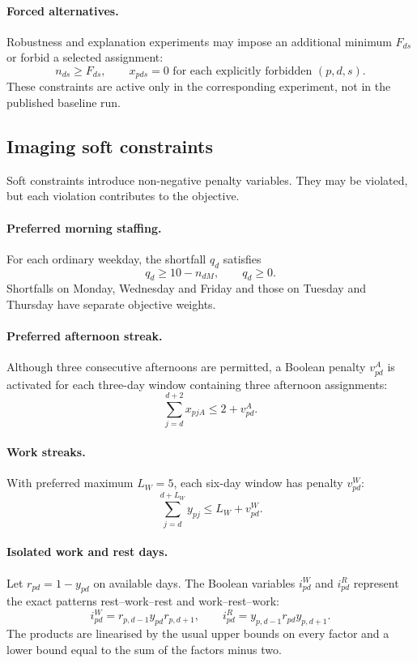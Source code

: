 \documentclass[11pt,a4paper]{article}
\begin{document}
\paragraph{Forced alternatives.}
Robustness and explanation experiments may impose an additional minimum $F_{ds}$ or forbid a selected assignment:
\[
 n_{ds}\geq F_{ds},
 \qquad x_{pds}=0\text{ for each explicitly forbidden }(p,d,s).
\]
These constraints are active only in the corresponding experiment, not in the published baseline run.

\subsection{Imaging soft constraints}

Soft constraints introduce non-negative penalty variables. They may be violated, but each violation contributes to the objective.

\paragraph{Preferred morning staffing.}
For each ordinary weekday, the shortfall $q_d$ satisfies
\[
 q_d\geq10-n_{dM},\qquad q_d\geq0.
\]
Shortfalls on Monday, Wednesday and Friday and those on Tuesday and Thursday have separate objective weights.

\paragraph{Preferred afternoon streak.}
Although three consecutive afternoons are permitted, a Boolean penalty $v^{A}_{pd}$ is activated for each three-day window containing three afternoon assignments:
\[
 \sum_{j=d}^{d+2}x_{pjA}\leq2+v^{A}_{pd}.
\]

\paragraph{Work streaks.}
With preferred maximum $L_W=5$, each six-day window has penalty $v^{W}_{pd}$:
\[
 \sum_{j=d}^{d+L_W}y_{pj}\leq L_W+v^{W}_{pd}.
\]

\paragraph{Isolated work and rest days.}
Let $r_{pd}=1-y_{pd}$ on available days. The Boolean variables $i^{W}_{pd}$ and $i^{R}_{pd}$ represent the exact patterns rest--work--rest and work--rest--work:
\[
 i^{W}_{pd}=r_{p,d-1}y_{pd}r_{p,d+1},
 \qquad
 i^{R}_{pd}=y_{p,d-1}r_{pd}y_{p,d+1}.
\]
The products are linearised by the usual upper bounds on every factor and a lower bound equal to the sum of the factors minus two.
\end{document}
